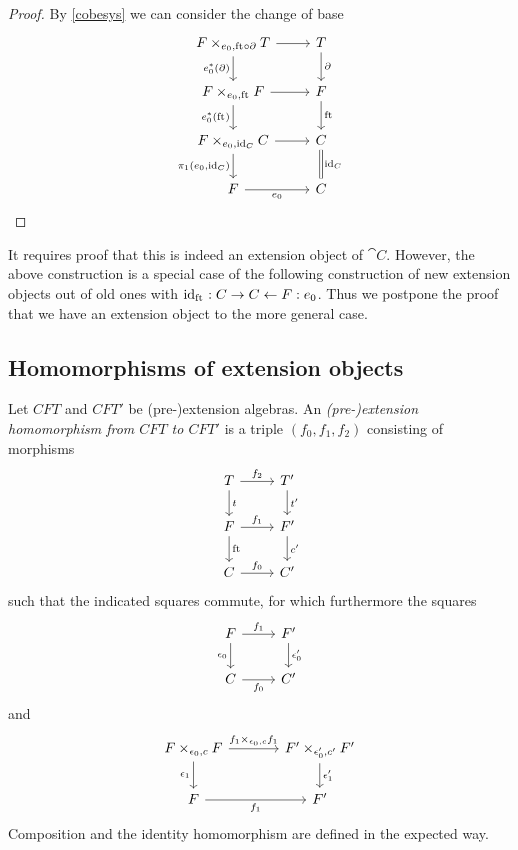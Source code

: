 \begin{proof}
By \autoref{cobesys} we can consider the change of base
\begin{equation*}
\begin{tikzcd}
\cobesys{\stesysf}{\stesyst}{\ectxext}{\eft\circ\ebd}
  \ar{r}
  \ar{d}[swap]{\ectxext^\ast(\ebd)}
  &
\stesyst
  \ar{d}{\ebd}
  \\
\cobesys{\stesysf}{\stesysf}{\ectxext}{\eft}
  \ar{r}
  \ar{d}[swap]{\ectxext^\ast(\eft)}
  &
\stesysf
  \ar{d}{\eft}
  \\
\cobesys{\stesysf}{\stesysc}{\ectxext}{\catid{\stesysc}}
  \ar{r}
  \ar{d}[swap]{\pullbackpr{1}{\ectxext}{\catid{\stesysc}}}
  &
\stesysc
  \ar[equals]{d}{\catid{\stesysc}}
  \\
\stesysf \ar{r}[swap]{\ectxext}
  &
\stesysc
\end{tikzcd}
\end{equation*}
\end{proof}

It requires proof that this is indeed an extension object of $\cat{C}$. However, the above
construction is a special case of the following construction of new extension objects out
of old ones with ${\mathrm{id}_{\mathrm{ft}_{}}}:C\rightarrow C\leftarrow F:e_0$. Thus we postpone the proof
that we have an extension object to the more general case. 

\subsection{Homomorphisms of extension objects}
\begin{defn}
Let $CFT$ and $CFT'$ be (pre-)extension algebras. An \emph{(pre-)extension homomorphism from 
$CFT$ to $CFT'$} is a triple $(f_0,f_1,f_2)$ consisting of morphisms
\begin{equation*}
\begin{tikzcd}
T 
  \ar{r}{f_2}
  \ar{d}{t}
  &
T'
  \ar{d}{t'}
  \\
F 
  \ar{r}{f_1}
  \ar{d}{\eft}
  &
F'
  \ar{d}{c'}
  \\
C 
  \ar{r}{f_0}
  &
C'
\end{tikzcd}
\end{equation*}
such that the indicated squares commute, for which furthermore the squares
\begin{equation*}
\begin{tikzcd}
F \ar{r}{f_1}
  \ar{d}[swap]{\epsilon_0}
  &
F'
  \ar{d}{\epsilon_0'}
  \\
C \ar{r}[swap]{f_0}
  &
C'
\end{tikzcd}
\end{equation*}
and
\begin{equation*}
\begin{tikzcd}[column sep=large]
F\times_{\epsilon_0,c} F
  \ar{r}{f_1\times_{\epsilon_0,c} f_1}
  \ar{d}[swap]{\epsilon_1}
  &
F'\times_{\epsilon_0',c'} F'
  \ar{d}{\epsilon_1'}
  \\
F \ar{r}[swap]{f_1}
  &
F'
\end{tikzcd}
\end{equation*}
Composition and the identity homomorphism are defined in the expected way.
\end{defn}

